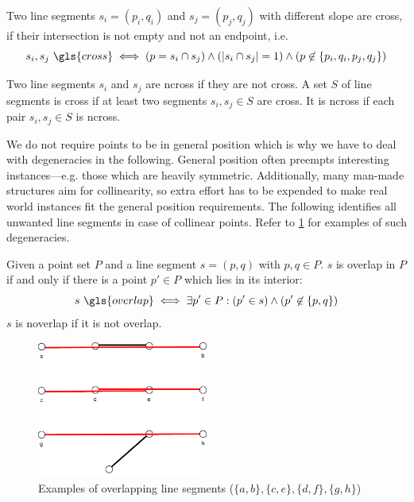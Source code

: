 \begin{definition}[Crossing]\label{def:crossing}
  Two line segments \(s_i=(p_i,q_i)\) and \(s_j=(p_j,q_j)\) with 
  different slope are \gls{cross}, if their intersection is not empty
  and not an endpoint, i.e.
  \[
    s_i, s_j~\gls{cross}
    \iff
    (p = s_i\cap s_j) \land
    (|s_i\cap s_j| = 1) \land
    (p \not\in \{p_i,q_i,p_j,q_j\})
  \]

  Two line segments \(s_i\) and \(s_j\) are \gls{ncross}
  if they are not \gls{cross}.
  A set \(S\) of line segments is \gls{cross}
  if at least two segments \(s_i, s_j \in S\) are \gls{cross}.
  It is \gls{ncross} if each pair \(s_i, s_j \in S\) is \gls{ncross}.
\end{definition}

We do not require points to be in general position which is why we
have to deal with degeneracies in the following. General position
often preempts interesting instances---e.g. those which are heavily
symmetric. Additionally, many man-made structures aim for
collinearity, so extra effort has to be expended to make real world
instances fit the general position requirements. The following
 identifies all unwanted line
segments in case of collinear points. Refer to
\cref{fig:overlapping_segments} for examples of such degeneracies.

\begin{definition}
  \label{def:overlapping_segments}
  Given a point set \(P\) and a line segment \(s = (p,q)\) with
  \(p,q \in P\). \(s\) is \gls{overlap} in \(P\) if and only if
  there is a point \(p' \in P\) which lies in its interior:
  \[
    s~\gls{overlap}
    \iff  \exists p' \in P : (p' \in s) \land (p' \not\in \{p,q\})
  \]
  \(s\) is \gls{noverlap} if it is not \gls{overlap}.
\end{definition}

\begin{figure}[ht]
  \centering
  \includegraphics[width=0.5\textwidth]{img/example_overlapping.pdf}
  \caption{\label{fig:overlapping_segments}%
    Examples of overlapping line segments %
    (\(\{a,b\}, \{c,e\}, \{d,f\}, \{g,h\}\))%
  }
\end{figure}

